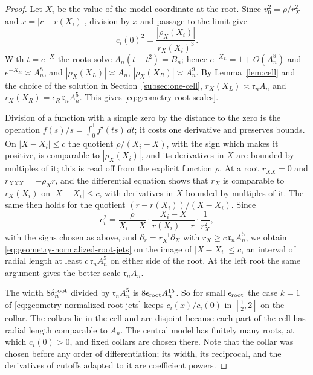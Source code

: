 \begin{proof}
Let $X_i$ be the value of the model coordinate at the root. Since
$v_0^2=\rho/r_X^2$ and $x=|r-r(X_i)|$, division by $x$ and passage to
the limit give
\[
 c_i(0)^2=\frac{|\rho_X(X_i)|}{r_X(X_i)^3}.
\]
With $t=e^{-X}$ the roots solve $A_n(t-t^2)=B_n$; hence
$e^{-X_L}=1+O(A_n^8)$ and $e^{-X_R}\asymp A_n^8$, and
$|\rho_X(X_L)|\asymp A_n$, $|\rho_X(X_R)|\asymp A_n^9$. By
Lemma~\ref{lem:cell} and the choice of the solution in
Section~\ref{subsec:one-cell}, $r_X(X_L)\asymp\mathfrak r_nA_n$ and
$r_X(X_R)=\epsilon_R\,\mathfrak r_nA_n^5$. This gives
\eqref{eq:geometry-root-scales}.

Division of a function with a simple zero by the distance to the zero
is the operation $f(s)/s=\int_0^1f'(ts)\,dt$; it costs one derivative
and preserves bounds. On $|X-X_i|\le c$ the quotient
$\rho/(X_i-X)$, with the sign which makes it positive, is comparable
to $|\rho_X(X_i)|$, and its derivatives in $X$ are bounded by
multiples of it; this is read off from the explicit function $\rho$.
At a root $r_{XX}=0$ and $r_{XXX}=-\rho_Xr$, and the differential
equation shows that $r_X$ is comparable to $r_X(X_i)$ on
$|X-X_i|\le c$, with derivatives in $X$ bounded by multiples of it.
The same then holds for the quotient $(r-r(X_i))/(X-X_i)$. Since
\[
 c_i^2=\frac{\rho}{X_i-X}\cdot\frac{X_i-X}{r(X_i)-r}\cdot\frac1{r_X^2},
\]
with the signs chosen as above, and
$\partial_r=r_X^{-1}\partial_X$ with $r_X\ge c\,\mathfrak r_nA_n^5$,
we obtain \eqref{eq:geometry-normalized-root-jets} on the image of
$|X-X_i|\le c$, an interval of radial length at least
$c\,\mathfrak r_nA_n^5$ on either side of the root. At the left root
the same argument gives the better scale $\mathfrak r_nA_n$.

The width $8\delta_n^{\rm root}$ divided by $\mathfrak r_nA_n^5$ is
$8\epsilon_{\rm root}A_n^{15}$. So for small $\epsilon_{\rm root}$ the
case $k=1$ of \eqref{eq:geometry-normalized-root-jets} keeps
$c_i(x)/c_i(0)$ in $[\tfrac12,2]$ on the collar. The collars lie in
the cell and are disjoint because each part of the cell has radial
length comparable to $A_n$. The central model has finitely many
roots, at which $c_i(0)>0$, and fixed collars are chosen there. Note
that the collar was chosen before any order of differentiation; its
width, its reciprocal, and the derivatives of cutoffs adapted to it
are coefficient powers.
\end{proof}

